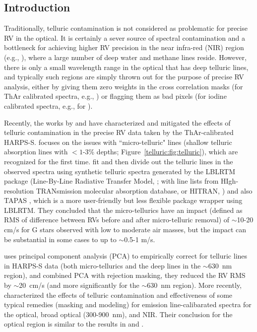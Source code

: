 \subsection{Introduction}\label{keck:telluric:intro}

Traditionally, telluric contamination is not considered as problematic
for precise RV in the optical. It is certainly a sever source of
spectral contamination and a bottleneck for achieving higher RV
precision in the near infra-red (NIR) region (e.g.,
\citealt{2010ApJ...713..410B}), where a large number of deep water and
methane lines reside. However, there is only a small wavelength
range in the optical that has deep telluric lines, and typically such
regions are simply thrown out for the purpose of precise RV analysis,
either by giving them zero weights in the cross correlation masks (for
ThAr calibrated spectra, e.g., \citealt{2002A&A...388..632P}) or
flagging them as bad pixels (for iodine calibrated spectra, e.g., for
\keck).

Recently, the works by \cite{artigau2014} and \cite{cunha2014} have
characterized and mitigated the effects of telluric contamination in
the precise RV data taken by the ThAr-calibrated HARPS-S.
\cite{cunha2014} focuses on the issues with ``micro-telluric" lines
(shallow telluric absorption lines with $<1$-3\% depths;
Figure~\ref{telluric:fig:telluric}), which are recognized for the
first time. \cite{cunha2014} fit and then divide out the telluric
lines in the observed spectra using synthetic telluric spectra
generated by the LBLRTM package (Line-By-Line Radiative Transfer
Model, \citealt{lblrtm}; with line lists from HIgh-resolution
TRANsmission molecular absorption database, or HITRAN,
\citealt{hitran2013}) and also TAPAS \citep{tapas}, which is a more
user-friendly but less flexible package wrapper using LBLRTM. They
concluded that the micro-tellurics have an impact (defined as RMS of
difference between RVs before and after micro-telluric removal) of
$\sim$10-20 cm/s for G stars observed with low to moderate air masses,
but the impact can be substantial in some cases to up to $\sim$0.5-1
m/s.

\cite{artigau2014} uses principal component analysis (PCA) to
empirically correct for telluric lines in HARPS-S data (both
micro-tellurics and the deep lines in the $\sim$630~nm region), and
combined PCA with rejection masking, they reduced the RV RMS by
$\sim$20~cm/s (and more significantly for the $\sim$630~nm
region). More recently, \cite{2016AAS...22713719S} characterized the
effects of telluric contamination and effectiveness of some typical
remedies (masking and modeling) for emission line-calibarated spectra
for the optical, broad optical (300-900~nm), and NIR. Their conclusion
for the optical region is similar to the results in \cite{artigau2014}
and \cite{cunha2014}.

